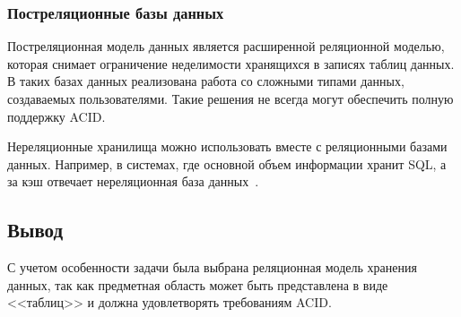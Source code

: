  
\subsubsection{Постреляционные базы данных}

Постреляционная модель данных является расширенной реляционной моделью, которая снимает ограничение неделимости хранящихся в записях таблиц данных. В таких базах данных реализована работа со сложными типами данных, создаваемых пользователями. Такие решения не всегда могут обеспечить полную поддержку ACID. 

Нереляционные хранилища можно использовать вместе с реляционными базами данных. Например, в системах, где основной объем информации хранит SQL, а за кэш отвечает нереляционная база данных~\cite{amazon}.

\subsection*{Вывод}

С учетом особенности задачи была выбрана реляционная модель хранения данных, так как предметная область может быть представлена в виде <<таблиц>> и должна удовлетворять требованиям ACID.


